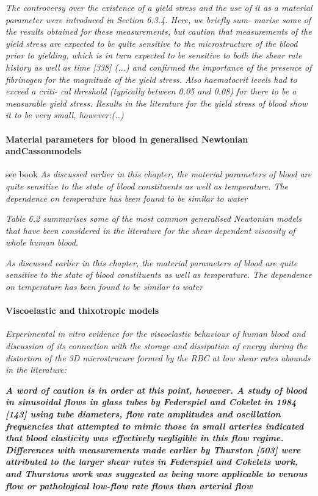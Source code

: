 \documentclass[11pt,letterpaper]{article}
\begin{document}
\textit{The controversy over the existence of a yield stress and the use of it as
a material parameter were introduced in Section 6.3.4. Here, we briefly sum- marise some of the results obtained for these measurements, but caution that measurements of the yield stress are expected to be quite sensitive to the microstructure of the blood prior to yielding, which is in turn expected to be sensitive to both the shear rate history as well as time [338] (...) and confirmed the importance of the presence of fibrinogen for the magnitude of the yield stress. Also haematocrit levels had to exceed a criti- cal threshold (typically between 0.05 and 0.08) for there to be a measurable yield stress. Results in the literature for the yield stress of blood show it to be very small, however:(..)}

\paragraph{Material parameters for blood in generalised Newtonian andCassonmodels}
see book
\textit{As discussed earlier in this chapter, the material parameters of blood are
quite sensitive to the state of blood constituents as well as temperature. The dependence on temperature has been found to be similar to water}

\textit{Table 6.2 summarises some of the most common generalised Newtonian
models that have been considered in the literature for the shear dependent viscosity of whole human blood.}

\textit{As discussed earlier in this chapter, the material parameters of blood are
quite sensitive to the state of blood constituents as well as temperature. The dependence on temperature has been found to be similar to water}

\paragraph{ Viscoelastic and thixotropic models}
 \textit{Experimental in vitro evidence for the viscoelastic behaviour of human blood and discussion of its connection with the storage and dissipation of energy during the distortion of the 3D microstrucure formed by the RBC at low shear rates abounds in the literature:}

\textit{\textbf{A word of caution is in order at this point, however. A study of blood in sinusoidal flows in glass tubes by Federspiel and Cokelet in 1984 [143] using tube diameters, flow rate amplitudes and oscillation frequencies that attempted to mimic those in small arteries indicated that blood elasticity was effectively negligible in this flow regime. Differences with measurements made earlier by Thurston [503] were attributed to the larger shear rates in Federspiel and Cokelets work, and Thurstons work was suggested as being more applicable to venous flow or pathological low-flow rate flows than arterial flow}}
\end{document}
